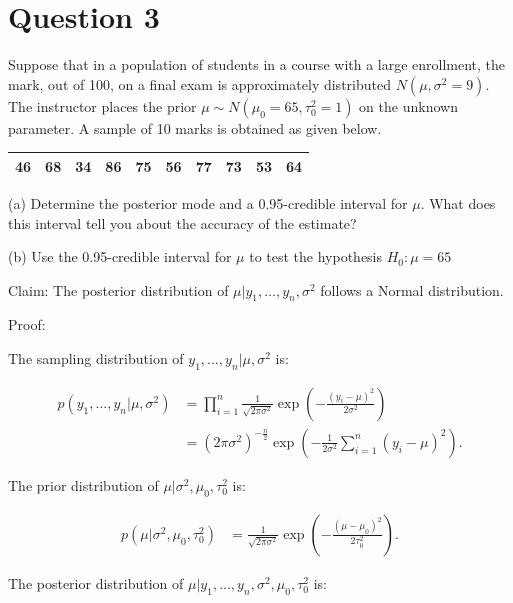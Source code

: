 \documentclass[11pt]{article}
\newcommand{\prob}[1]{
\begin{tcolorbox}[colback=green!5!white,colframe=green!75!black]
#1
\end{tcolorbox}
}
\begin{document}
\section{Question 3}

\prob{Suppose that in a population of students in a course with a large enrollment, the mark, out of 100, on a final exam is approximately distributed $N (\mu, \sigma^2 = 9)$. The instructor places the prior $\mu \sim N(\mu_0=65,\tau_0^2=1)$ on the unknown parameter. A sample of 10 marks is obtained as given below.

\begin{center}
\begin{tabular}{cccccccccc}
\hline
46 & 68 & 34 & 86 & 75 & 56 & 77 & 73 & 53 & 64\\
\hline
\end{tabular}
\end{center}

(a) Determine the posterior mode and a 0.95-credible interval for $\mu$. What does this interval tell you about the accuracy of the estimate?

(b) Use the 0.95-credible interval for $\mu$ to test the hypothesis $H_0: \mu = 65$
}

Claim: The posterior distribution of $\mu|y_1,\ldots,y_n,\sigma^2$ follows a Normal distribution.

Proof:

The sampling distribution of $y_1,\ldots,y_n | \mu, \sigma^2$ is: 

\begin{align*}
p(y_1,\ldots,y_n|\mu,\sigma^2) 
&= \prod_{i=1}^{n} \frac{1}{\sqrt{2\pi\sigma^2} }\exp\left( -\frac{(y_i-\mu)^2}{2\sigma^2}  \right)   \\
&=(2\pi\sigma^2)^{-\frac{n}{2}}\exp\left( -\frac{1}{2\sigma^2}\sum_{i=1}^{n} \left(y_i-\mu \right) ^2 \right) 
.\end{align*}

The prior distribution of $\mu|\sigma^2,\mu_0,\tau_0^2$ is:

\begin{align*}
p(\mu|\sigma^2,\mu_0,\tau_0^2)
&=\frac{1}{\sqrt{2\pi\sigma^2}} \exp\left( -\frac{\left( \mu-\mu_0 \right)^2 }{2\tau_0^2} \right)
.\end{align*}

The posterior distribution of $\mu|y_1,\ldots,y_n,\sigma^2,\mu_0,\tau_0^2$ is:
\end{document}

